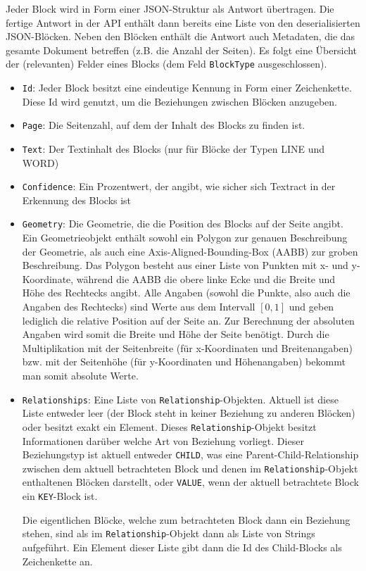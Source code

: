 \documentclass{whswinvcbook}
\begin{document}
Jeder Block wird in Form einer JSON-Struktur als Antwort übertragen. Die fertige Antwort in der API enthält dann bereits eine Liste von den deserialisierten JSON-Blöcken. Neben den Blöcken enthält die Antwort auch Metadaten, die das gesamte Dokument betreffen (z.B. die Anzahl der Seiten). Es folgt eine Übersicht der (relevanten) Felder eines Blocks (dem Feld \texttt{BlockType} ausgeschlossen).
\begin{itemize}
    \item \texttt{Id}: Jeder Block besitzt eine eindeutige Kennung in Form einer Zeichenkette. Diese Id wird genutzt, um die Beziehungen zwischen Blöcken anzugeben.
    \item \texttt{Page}: Die Seitenzahl, auf dem der Inhalt des Blocks zu finden ist.
    \item \texttt{Text}: Der Textinhalt des Blocks (nur für Blöcke der Typen LINE und WORD)
    \item \texttt{Confidence}: Ein Prozentwert, der angibt, wie sicher sich Textract in der Erkennung des Blocks ist
    \item \texttt{Geometry}: Die Geometrie, die die Position des Blocks auf der Seite angibt. Ein Geometrieobjekt enthält sowohl ein Polygon zur genauen Beschreibung der Geometrie, als auch eine Axis-Aligned-Bounding-Box (AABB) zur groben Beschreibung. Das Polygon besteht aus einer Liste von Punkten mit x- und y-Koordinate, während die AABB die obere linke Ecke und die Breite und Höhe des Rechtecks angibt. Alle Angaben (sowohl die Punkte, also auch die Angaben des Rechtecks) sind Werte aus dem Intervall $[0,1]$ und geben lediglich die relative Position auf der Seite an. Zur Berechnung der absoluten Angaben wird somit die Breite und Höhe der Seite benötigt. Durch die Multiplikation mit der Seitenbreite (für x-Koordinaten und Breitenangaben) bzw. mit der Seitenhöhe (für y-Koordinaten und Höhenangaben) bekommt man somit absolute Werte.
    \item \texttt{Relationships}: Eine Liste von \texttt{Relationship}-Objekten. Aktuell ist diese Liste entweder leer (der Block steht in keiner Beziehung zu anderen Blöcken) oder besitzt exakt ein Element. Dieses \texttt{Relationship}-Objekt besitzt Informationen darüber welche Art von Beziehung vorliegt. Dieser Beziehungstyp ist aktuell entweder \texttt{CHILD}, was eine Parent-Child-Relationship zwischen dem aktuell betrachteten Block und denen im \texttt{Relationship}-Objekt enthaltenen Blöcken darstellt, oder \texttt{VALUE}, wenn der aktuell betrachtete Block ein \texttt{KEY}-Block ist.
    
    Die eigentlichen Blöcke, welche zum betrachteten Block dann ein Beziehung stehen, sind als im \texttt{Relationship}-Objekt dann als Liste von Strings aufgeführt. Ein Element dieser Liste gibt dann die Id des Child-Blocks als Zeichenkette an.
\end{itemize}
\end{document}
